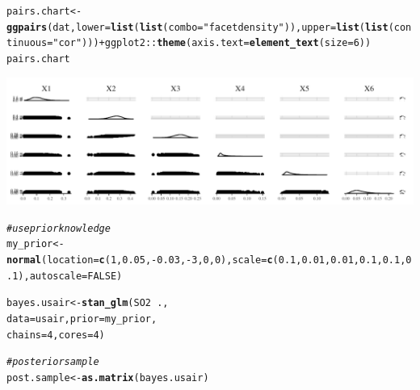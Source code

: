 \documentclass[11pt,a4paper,twoside]{book}
\makeatletter
\def\maxwidth{ %
  \ifdim\Gin@nat@width>\linewidth
    \linewidth
  \else
    \Gin@nat@width
  \fi
}
\newcommand{\hlnum}[1]{\textcolor[rgb]{0.686,0.059,0.569}{#1}}%
\newcommand{\hlstr}[1]{\textcolor[rgb]{0.192,0.494,0.8}{#1}}%
\newcommand{\hlcom}[1]{\textcolor[rgb]{0.678,0.584,0.686}{\textit{#1}}}%
\newcommand{\hlopt}[1]{\textcolor[rgb]{0,0,0}{#1}}%
\newcommand{\hlstd}[1]{\textcolor[rgb]{0.345,0.345,0.345}{#1}}%
\newcommand{\hlkwb}[1]{\textcolor[rgb]{0.69,0.353,0.396}{#1}}%
\newcommand{\hlkwc}[1]{\textcolor[rgb]{0.333,0.667,0.333}{#1}}%
\newcommand{\hlkwd}[1]{\textcolor[rgb]{0.737,0.353,0.396}{\textbf{#1}}}%
\newenvironment{kframe}{%
 \def\at@end@of@kframe{}%
 \ifinner\ifhmode%
  \def\at@end@of@kframe{\end{minipage}}%
  \begin{minipage}{\columnwidth}%
 \fi\fi%
 \def\FrameCommand##1{\hskip\@totalleftmargin \hskip-\fboxsep
 \colorbox{shadecolor}{##1}\hskip-\fboxsep
     \hskip-\linewidth \hskip-\@totalleftmargin \hskip\columnwidth}%
 \MakeFramed {\advance\hsize-\width
   \@totalleftmargin\z@ \linewidth\hsize
   \@setminipage}}%
 {\par\unskip\endMakeFramed%
 \at@end@of@kframe}
\newenvironment{knitrout}{}{} %
\makeatother
\begin{document}
\begin{knitrout}
\begin{kframe}
\begin{alltt}
\hlstd{pairs.chart} \hlkwb{<-} \hlkwd{ggpairs}\hlstd{(dat,} \hlkwc{lower} \hlstd{=} \hlkwd{list}\hlstd{(}\hlkwd{list}\hlstd{(}\hlkwc{combo} \hlstd{=} \hlstr{"facetdensity"}\hlstd{)),} \hlkwc{upper} \hlstd{=} \hlkwd{list}\hlstd{(}\hlkwd{list}\hlstd{(}\hlkwc{continuous} \hlstd{=} \hlstr{"cor"}\hlstd{)))} \hlopt{+} \hlstd{ggplot2}\hlopt{::}\hlkwd{theme}\hlstd{(}\hlkwc{axis.text} \hlstd{=} \hlkwd{element_text}\hlstd{(}\hlkwc{size} \hlstd{=} \hlnum{6}\hlstd{))}
\hlstd{pairs.chart}
\end{alltt}
\end{kframe}
\includegraphics[width=\maxwidth]{figure/ch03_figreal_data_LMG-1} 
\begin{kframe}\begin{alltt}
\hlcom{#use prior knowledge}
\hlstd{my_prior} \hlkwb{<-} \hlkwd{normal}\hlstd{(}\hlkwc{location} \hlstd{=} \hlkwd{c}\hlstd{(}\hlnum{1}\hlstd{,} \hlnum{0.05}\hlstd{,}\hlopt{-}\hlnum{0.03}\hlstd{,}\hlopt{-}\hlnum{3}\hlstd{,} \hlnum{0}\hlstd{,} \hlnum{0}\hlstd{),} \hlkwc{scale} \hlstd{=} \hlkwd{c}\hlstd{(}\hlnum{0.1}\hlstd{,} \hlnum{0.01}\hlstd{,}\hlnum{0.01}\hlstd{,}\hlnum{0.1}\hlstd{,} \hlnum{0.1}\hlstd{,} \hlnum{0.1}\hlstd{),} \hlkwc{autoscale} \hlstd{=} \hlnum{FALSE}\hlstd{)}


\hlstd{bayes.usair} \hlkwb{<-} \hlkwd{stan_glm}\hlstd{(SO2} \hlopt{~} \hlstd{. ,}
                  \hlkwc{data} \hlstd{= usair,} \hlkwc{prior} \hlstd{= my_prior,}
                  \hlkwc{chains} \hlstd{=} \hlnum{4}\hlstd{,} \hlkwc{cores} \hlstd{=} \hlnum{4}\hlstd{)}

\hlcom{#posterior sample}
\hlstd{post.sample} \hlkwb{<-} \hlkwd{as.matrix}\hlstd{(bayes.usair)}


\end{alltt}
\end{kframe}
\end{knitrout}
\end{document}
